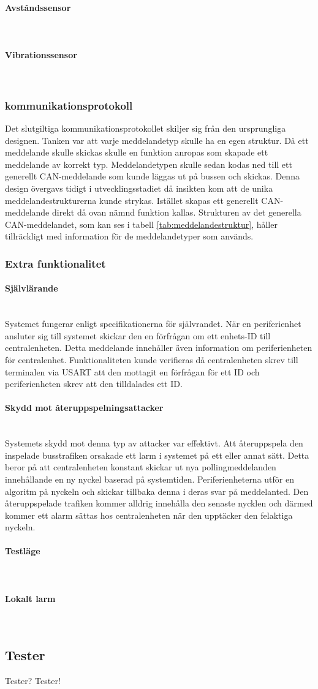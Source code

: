 \documentclass[a4paper]{article}
\newcommand{\todo}[1]{\marginpar{TODO: #1}\vspace{1cm}}
\newcommand{\subsubsubsection}[1]{\paragraph{#1}\mbox{}\\}
\begin{document}
\subsubsubsection{Avståndssensor}
\todo{}

\subsubsubsection{Vibrationssensor}

\subsubsection{kommunikationsprotokoll}
Det slutgiltiga kommunikationsprotokollet skiljer sig från den ursprungliga designen.
Tanken var att varje meddelandetyp skulle ha en egen struktur.
Då ett meddelande skulle skickas skulle en funktion anropas som skapade ett meddelande av korrekt typ.
Meddelandetypen skulle sedan kodas ned till ett generellt CAN-meddelande som kunde läggas ut på bussen och skickas.
Denna design övergavs tidigt i utvecklingsstadiet då insikten kom att de unika meddelandestrukturerna kunde strykas.
Istället skapas ett generellt CAN-meddelande direkt då ovan nämnd funktion kallas.
Strukturen av det generella CAN-meddelandet, som kan ses i tabell \ref{tab:meddelandestruktur}, håller tillräckligt med information för de meddelandetyper som används.


\subsubsection{Extra funktionalitet}
\subsubsubsection{Självlärande}
Systemet fungerar enligt specifikationerna för självrandet. 
När en periferienhet ansluter sig till systemet skickar den en förfrågan om ett enhets-ID till centralenheten.
Detta meddelande innehåller även information om periferienheten för centralenhet.
Funktionaliteten kunde verifieras då centralenheten skrev till terminalen via USART att den mottagit en förfrågan för ett ID och periferienheten skrev att den tilldalades ett ID.
\subsubsubsection{Skydd mot återuppspelningsattacker}
Systemets skydd mot denna typ av attacker var effektivt. 
Att återuppspela den inspelade busstrafiken orsakade ett larm i systemet på ett eller annat sätt. 
Detta beror på att centralenheten konstant skickar ut nya pollingmeddelanden innehållande en ny nyckel baserad på systemtiden. 
Periferienheterna utför en algoritm på nyckeln och skickar tillbaka denna i deras svar på meddelanted.
Den återuppspelade trafiken kommer alldrig innehålla den senaste nycklen och därmed kommer ett alarm sättas hos centralenheten när den upptäcker den felaktiga nyckeln. 

\subsubsubsection{Testläge}
\subsubsubsection{Lokalt larm}

\subsection{Tester}
Tester? Tester!
\end{document}
